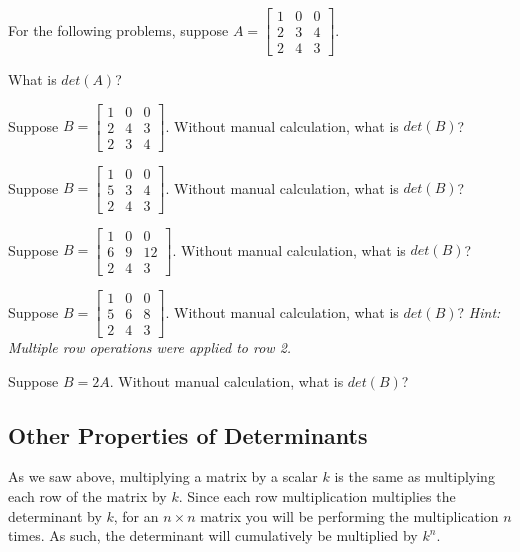 \documentclass[11pt]{exam}
\begin{document}
    \vspace{20px}
    For the following problems, suppose $A = \begin{bmatrix} 1 & 0 & 0 \\ 2 & 3 & 4 \\ 2 & 4 & 3 \end{bmatrix}$.
    \begin{questions}
        \item What is $det(A)$?
        \item Suppose $B = \begin{bmatrix} 1 & 0 & 0 \\ 2 & 4 & 3 \\ 2 & 3 & 4 \end{bmatrix}$. Without manual calculation, what is
        $det(B)$?
        \item Suppose $B = \begin{bmatrix} 1 & 0 & 0 \\ 5 & 3 & 4 \\ 2 & 4 & 3 \end{bmatrix}$. Without manual calculation, what is
        $det(B)$?
        \item Suppose $B = \begin{bmatrix} 1 & 0 & 0 \\ 6 & 9 & 12 \\ 2 & 4 & 3 \end{bmatrix}$. Without manual calculation, what is
        $det(B)$?
        \pagebreak
        \item Suppose $B = \begin{bmatrix} 1 & 0 & 0 \\ 5 & 6 & 8 \\ 2 & 4 & 3 \end{bmatrix}$. Without manual calculation, what is
        $det(B)$? \textit{Hint: Multiple row operations were applied to row 2.}
        \item Suppose $B = 2A$. Without manual calculation, what is $det(B)$?
    \end{questions}

    \vspace{20px}
    \subsection{Other Properties of Determinants}

    As we saw above, multiplying a matrix by a scalar $k$ is the same as multiplying each row of the matrix by $k$. Since each
    row multiplication multiplies the determinant by $k$, for an $n \times n$ matrix you will be performing the multiplication
    $n$ times. As such, the determinant will cumulatively be multiplied by $k^n$.
\end{document}
